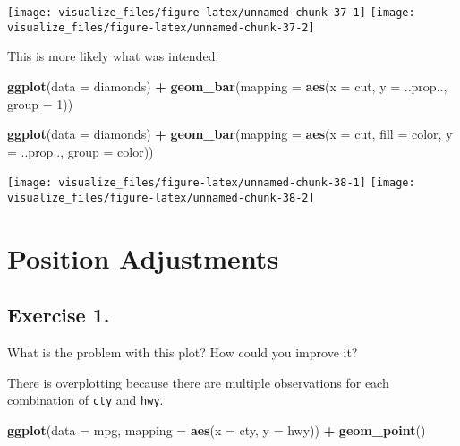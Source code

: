 \documentclass[]{book}
\newenvironment{Shaded}{\begin{snugshade}}{\end{snugshade}}
\newcommand{\DataTypeTok}[1]{\textcolor[rgb]{0.13,0.29,0.53}{#1}}
\newcommand{\DecValTok}[1]{\textcolor[rgb]{0.00,0.00,0.81}{#1}}
\newcommand{\KeywordTok}[1]{\textcolor[rgb]{0.13,0.29,0.53}{\textbf{#1}}}
\newcommand{\NormalTok}[1]{#1}
\newcommand{\OperatorTok}[1]{\textcolor[rgb]{0.81,0.36,0.00}{\textbf{#1}}}
\newcommand{\StringTok}[1]{\textcolor[rgb]{0.31,0.60,0.02}{#1}}
\theoremstyle{plain}
\theoremstyle{remark}
\theoremstyle{definition}
\theoremstyle{definition}
\theoremstyle{definition}
\theoremstyle{remark}
\begin{document}
\begin{center}\texttt{[image: visualize\_files/figure-latex/unnamed-chunk-37-1]} \texttt{[image: visualize\_files/figure-latex/unnamed-chunk-37-2]} \end{center}

This is more likely what was intended:

\begin{Shaded}
\begin{Highlighting}[]
\KeywordTok{ggplot}\NormalTok{(}\DataTypeTok{data =}\NormalTok{ diamonds) }\OperatorTok{+}
\StringTok{  }\KeywordTok{geom_bar}\NormalTok{(}\DataTypeTok{mapping =} \KeywordTok{aes}\NormalTok{(}\DataTypeTok{x =}\NormalTok{ cut, }\DataTypeTok{y =}\NormalTok{ ..prop.., }\DataTypeTok{group =} \DecValTok{1}\NormalTok{))}

\KeywordTok{ggplot}\NormalTok{(}\DataTypeTok{data =}\NormalTok{ diamonds) }\OperatorTok{+}
\StringTok{  }\KeywordTok{geom_bar}\NormalTok{(}\DataTypeTok{mapping =} \KeywordTok{aes}\NormalTok{(}\DataTypeTok{x =}\NormalTok{ cut, }\DataTypeTok{fill =}\NormalTok{ color, }\DataTypeTok{y =}\NormalTok{ ..prop.., }\DataTypeTok{group =}\NormalTok{ color))}
\end{Highlighting}
\end{Shaded}

\begin{center}\texttt{[image: visualize\_files/figure-latex/unnamed-chunk-38-1]} \texttt{[image: visualize\_files/figure-latex/unnamed-chunk-38-2]} \end{center}

\hypertarget{position-adjustments}{%
\section{Position Adjustments}\label{position-adjustments}}

\hypertarget{exercise-1.-1}{%
\subsection{Exercise 1.}\label{exercise-1.-1}}

What is the problem with this plot? How could you improve it?

There is overplotting because there are multiple observations for each
combination of \texttt{cty} and \texttt{hwy}.

\begin{Shaded}
\begin{Highlighting}[]
\KeywordTok{ggplot}\NormalTok{(}\DataTypeTok{data =}\NormalTok{ mpg, }\DataTypeTok{mapping =} \KeywordTok{aes}\NormalTok{(}\DataTypeTok{x =}\NormalTok{ cty, }\DataTypeTok{y =}\NormalTok{ hwy)) }\OperatorTok{+}
\StringTok{  }\KeywordTok{geom_point}\NormalTok{()}
\end{Highlighting}
\end{Shaded}
\end{document}
